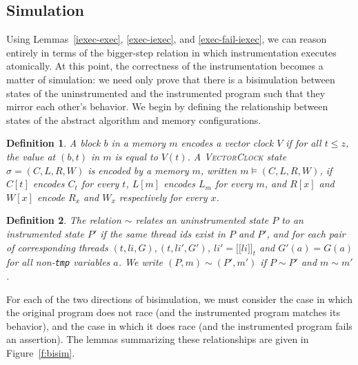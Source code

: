 \documentclass[preprint, 10pt]{sigplanconf}
\newcommand{\VCalg}{\textsc{VectorClock}\xspace}
\newcommand{\meanl}{\ensuremath{[ \! [}}
\newcommand{\meanr}{\ensuremath{] \! ]}}
\newcommand{\means}[1]{\ensuremath{\meanl #1 \meanr}}
\newcommand{\instr}[2]{\ensuremath{\means{#2}_{#1}}}
\newtheorem{definition}{Definition}
\begin{document}
\subsection{Simulation}

Using Lemmas~\ref{iexec-exec}, \ref{exec-iexec}, and \ref{exec-fail-iexec}, we can reason entirely in terms of the bigger-step relation in which instrumentation executes atomically. At this point, the correctness of the instrumentation becomes a matter of simulation: we need only prove that there is a bisimulation between states of the uninstrumented and the instrumented program such that they mirror each other's behavior. We begin by defining the relationship between states of the abstract algorithm and memory configurations.

\begin{definition}A block $b$ in a memory $m$ \emph{encodes} a vector clock $V$ if for all $t \le z$, the value at $(b, t)$ in $m$ is equal to $V(t)$. A \VCalg state $\sigma = (C, L, R, W)$ is encoded by a memory $m$, written $m \models (C, L, R, W)$, if $C[t]$ encodes $C_t$ for every $t$, $L[m]$ encodes $L_m$ for every $m$, and $R[x]$ and $W[x]$ encode $R_x$ and $W_x$ respectively for every $x$.\end{definition}

\begin{definition}The relation $\sim$ relates an uninstrumented state $P$ to an instrumented state $P'$ if the same thread ids exist in $P$ and $P'$, and for each pair of corresponding threads $(t, \mathit{li}, G), (t, \mathit{li}', G')$, $\mathit{li}' = \instr{t}{\mathit{li}}$ and $G'(a) = G(a)$ for all non-\texttt{tmp} variables $a$. We write $(P, m) \sim (P', m')$ if $P \sim P'$ and $m \sim m'$.\end{definition}

For each of the two directions of bisimulation, we must consider the
case in which the original program does not race (and the instrumented
program matches its behavior), and the case in which it does race (and
the instrumented program fails an assertion).  The lemmas summarizing
these relationships are given in Figure~\ref{f:bisim}.
\end{document}

